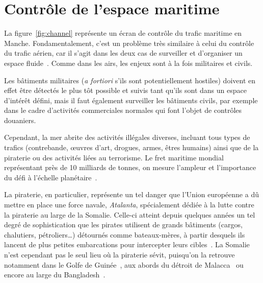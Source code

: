 \section{Contrôle de l'espace maritime}
	La figure~\ref{fig:channel} représente un écran de contrôle du trafic maritime en Manche. Fondamentalement, c'est un problème très similaire à celui du contrôle du trafic aérien, car il s'agit dans les deux cas de surveiller et d'organiser un espace fluide~\cite{henninger2012avant, henninger2013fluide}. Comme dans les airs, les enjeux sont à la fois militaires et civils.
	
	Les bâtiments militaires (\emph{a fortiori} s'ils sont potentiellement hostiles) doivent en effet être détectés le plus tôt possible et suivis tant qu'ils sont dans un espace d'intérêt défini, mais il faut également surveiller les bâtiments civils, par exemple dans le cadre d'activités commerciales normales qui font l'objet de contrôles douaniers.
	
	Cependant, la mer abrite des activités illégales diverses, incluant tous types de trafics (contrebande, œuvres d'art, drogues, armes, êtres humains) ainsi que de la piraterie ou des activités liées au terrorisme. Le fret maritime mondial représentant près de 10 milliards de tonnes, on mesure l'ampleur et l'importance du défi à l'échelle planétaire~\cite{unctad}.
	
	La piraterie, en particulier, représente un tel danger que l'Union européenne a dû mettre en place une force navale, \emph{Atalanta}\footnotemark, spécialement dédiée à la lutte contre la piraterie au large de la Somalie. Celle-ci atteint depuis quelques années un tel degré de sophistication que les pirates utilisent de grands bâtiments (cargos, chalutiers, pétroliers\ldots{}) détournés comme bateaux-mères, à partir desquels ils lancent de plus petites embarcations pour intercepter leurs cibles~\cite{audebaud2010lutte, guisnel2012pirates, dumas2015}. La Somalie n'est cependant pas le seul lieu où la piraterie sévit, puisqu'on la retrouve notamment dans le Golfe de Guinée~\cite{onuoha2012piracy}, aux abords du détroit de Malacca~\cite{raymond2009piracy} ou encore au large du Bangladesh~\cite{liss2011oceans}.
	
	
